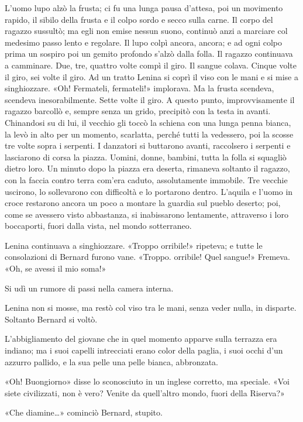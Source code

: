 \documentclass[
a5paper, %
10pt, %
twoside, 
onecolumn, %
openany, %
]{memoir}
\begin{document}
L’uomo lupo alzò la frusta; ci fu una lunga pausa d’attesa, poi un movimento rapido, il sibilo della frusta e il colpo sordo e secco sulla carne. Il corpo del ragazzo sussultò; ma egli non emise nessun suono, continuò anzi a marciare col medesimo passo lento e regolare. Il lupo colpì ancora, ancora; e ad ogni colpo prima un sospiro poi un gemito profondo s’alzò dalla folla. Il ragazzo continuava a camminare. Due, tre, quattro volte compì il giro. Il sangue colava. Cinque volte il giro, sei volte il giro. Ad un tratto Lenina si coprì il viso con le mani e si mise a singhiozzare. «Oh! Fermateli, fermateli!» implorava. Ma la frusta scendeva, scendeva inesorabilmente. Sette volte il giro. A questo punto, improvvisamente il ragazzo barcollò e, sempre senza un grido, precipitò con la testa in avanti. Chinandosi su di lui, il vecchio gli toccò la schiena con una lunga penna bianca, la levò in alto per un momento, scarlatta, perché tutti la vedessero, poi la scosse tre volte sopra i serpenti. I danzatori si buttarono avanti, raccolsero i serpenti e lasciarono di corsa la piazza. Uomini, donne, bambini, tutta la folla si squagliò dietro loro. Un minuto dopo la piazza era deserta, rimaneva soltanto il ragazzo, con la faccia contro terra com’era caduto, assolutamente immobile. Tre vecchie uscirono, lo sollevarono con difficoltà e lo portarono dentro. L’aquila e l’uomo in croce restarono ancora un poco a montare la guardia sul pueblo deserto; poi, come se avessero visto abbastanza, si inabissarono lentamente, attraverso i loro boccaporti, fuori dalla vista, nel mondo sotterraneo.

Lenina continuava a singhiozzare. «Troppo orribile!» ripeteva; e tutte le consolazioni di Bernard furono vane. «Troppo. orribile! Quel sangue!» Fremeva. «Oh, se avessi il mio soma!»

Si udì un rumore di passi nella camera interna.

Lenina non si mosse, ma restò col viso tra le mani, senza veder nulla, in disparte. Soltanto Bernard si voltò.

L’abbigliamento del giovane che in quel momento apparve sulla terrazza era indiano; ma i suoi capelli intrecciati erano color della paglia, i suoi occhi d’un azzurro pallido, e la sua pelle una pelle bianca, abbronzata.

«Oh! Buongiorno» disse lo sconosciuto in un inglese corretto, ma speciale. «Voi siete civilizzati, non è vero? Venite da quell’altro mondo, fuori della Riserva?»

«Che diamine…» cominciò Bernard, stupito.
\end{document}
